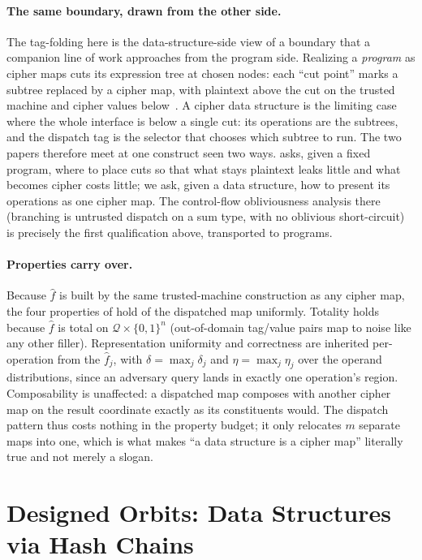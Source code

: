 \documentclass[11pt]{article}
\theoremstyle{definition}
\theoremstyle{plain}
\theoremstyle{definition}
\theoremstyle{remark}
\newcommand{\fhat}{\hat{f}}
\newcommand{\B}{\{0,1\}}
\begin{document}
\paragraph{The same boundary, drawn from the other side.} The
tag-folding here is the data-structure-side view of a boundary that a
companion line of work approaches from the program side. Realizing a
\emph{program} as cipher maps cuts its expression tree at chosen nodes:
each \enquote{cut point} marks a subtree replaced by a cipher map, with
plaintext above the cut on the trusted machine and cipher values
below~\cite{towell2026cipherprog}. A cipher data structure is the
limiting case where the whole interface is below a single cut: its
operations are the subtrees, and the dispatch tag is the selector that
chooses which subtree to run. The two papers therefore meet at one
construct seen two ways. \cite{towell2026cipherprog} asks, given a
fixed program, where to place cuts so that what stays plaintext leaks
little and what becomes cipher costs little; we ask, given a data
structure, how to present its operations as one cipher map. The
control-flow obliviousness analysis there (branching is untrusted
dispatch on a sum type, with no oblivious short-circuit) is precisely
the first qualification above, transported to programs.

\paragraph{Properties carry over.} Because $\fhat$ is built by the
same trusted-machine construction as any cipher map, the four
properties of  hold of the dispatched map
uniformly. Totality holds because $\fhat$ is total on $\mathcal{Q}
\times \B^n$ (out-of-domain tag/value pairs map to noise like any other
filler). Representation uniformity and correctness are inherited
per-operation from the $\fhat_j$, with $\delta = \max_j \delta_j$ and
$\eta = \max_j \eta_j$ over the operand distributions, since an
adversary query lands in exactly one operation's region. Composability
is unaffected: a dispatched map composes with another cipher map on the
result coordinate exactly as its constituents would. The dispatch
pattern thus costs nothing in the property budget; it only relocates
$m$ separate maps into one, which is what makes \enquote{a data
structure is a cipher map} literally true and not merely a slogan.

\section{Designed Orbits: Data Structures via Hash Chains}
\label{sec:designed-orbits}
\end{document}
